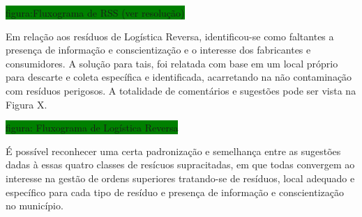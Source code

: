 	\colorbox{green}{figura:Fluxograma de RSS (ver resolução)}
	
	Em relação aos resíduos de Logística Reversa, identificou-se como faltantes a presença de informação e conscientização e o interesse dos fabricantes e consumidores. A solução para tais, foi relatada com base em um local próprio para descarte e coleta específica e identificada, acarretando na não contaminação com resíduos perigosos. A totalidade de comentários e sugestões pode ser vista na Figura X.
	
	\colorbox{green}{figura: Fluxograma de Logística Reversa}

	É possível reconhecer uma certa padronização e semelhança entre as sugestões dadas à essas quatro classes de resícuos supracitadas, em que todas convergem ao interesse na gestão de ordens superiores tratando-se de resíduos, local adequado e específico para cada tipo de resíduo e presença de informação e conscientização no município.
	